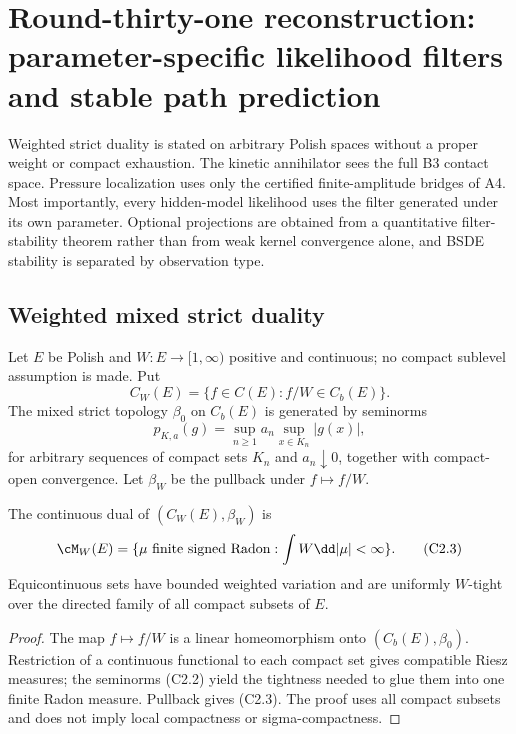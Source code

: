 \section{Round-thirty-one reconstruction: parameter-specific likelihood filters and stable path prediction}
\label{sec:r31-c2}

Weighted strict duality is stated on arbitrary Polish spaces without a proper
weight or compact exhaustion.  The kinetic annihilator sees the full B3
contact space.  Pressure localization uses only the certified finite-amplitude
bridges of A4.  Most importantly, every hidden-model likelihood uses the
filter generated under its own parameter.  Optional projections are obtained
from a quantitative filter-stability theorem rather than from weak kernel
convergence alone, and BSDE stability is separated by observation type.

\subsection{Weighted mixed strict duality}

Let $E$ be Polish and $W:E\to[1,\infty)$ positive and continuous; no compact
sublevel assumption is made.  Put
\[
 C_W(E)=\{f\in C(E):f/W\in C_b(E)\}.                      \tag{C2.1}
\]
The mixed strict topology $\beta_0$ on $C_b(E)$ is generated by seminorms
\[
 p_{K,a}(g)=\sup_{n\ge1}a_n\sup_{x\in K_n}|g(x)|,          \tag{C2.2}
\]
for arbitrary sequences of compact sets $K_n$ and $a_n\downarrow0$, together
with compact-open convergence.  Let $\beta_W$ be the pullback under $f\mapsto
f/W$.

\begin{theorem}
\label{thm:r31-c2-dual}
The continuous dual of $(C_W(E),\beta_W)$ is
\[
 \cM_W(E)=\{\mu\text{ finite signed Radon}:
                    \int W\dd|\mu|<\infty\}.              \tag{C2.3}
\]
Equicontinuous sets have bounded weighted variation and are uniformly
$W$-tight over the directed family of all compact subsets of $E$.
\end{theorem}

\begin{proof}
The map $f\mapsto f/W$ is a linear homeomorphism onto
$(C_b(E),\beta_0)$.  Restriction of a continuous functional to each compact
set gives compatible Riesz measures; the seminorms (C2.2) yield the tightness
needed to glue them into one finite Radon measure.  Pullback gives (C2.3).
The proof uses all compact subsets and does not imply local compactness or
sigma-compactness.
\end{proof}

